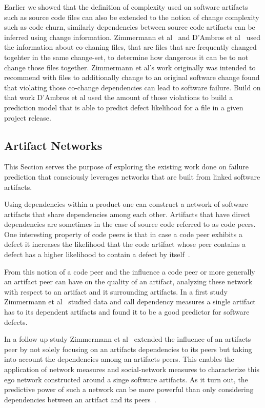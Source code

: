 Earlier we showed that the definition of complexity used on software artifacts such as source code files can also be extended to the notion of change complexity such as code churn, similarly dependencies between source code artifacts can be inferred using change information.
Zimmermann et al~\cite{zimmermann:icse:2004} and D'Ambros et al~\cite{dambros:wcre:2009} used the information about co-chaning files, that are files that are frequently changed togehter in the same change-set, to determine how dangerous it can be to not change those files together.
Zimmermann et al's work originally was intended to recommend with files to additionally change to an original software change  found that violating those co-change dependencies can lead to software failure.
Build on that work D'Ambros et al used the amount of those violations to build a prediction model that is able to predict defect likelihood for a file in a given project release. 


\subsection{Artifact Networks}
\label{chap:6:an}
This Section serves the purpose of exploring the existing work done on failure prediction that consciously leverages networks that are built from linked software artifacts.

Using dependencies within a product one can construct a network of software artifacts that share dependencies among each other.
Artifacts that have direct dependencies are sometimes in the case of source code referred to as code peers.
One interesting property of code peers is that in case a code peer exhibits a defect it increases the likelihood that the code artifact whose peer contains a defect has a higher likelihood to contain a defect by itself~\cite{nguyen:icse:2010}.

From this notion of a code peer and the influence a code peer or more generally an artifact peer can have on the quality of an artifact, analyzing these network with respect to an artifact and it surrounding artifacts.
In a first study Zimmermann et al~\cite{zimmermann:icse:2008} studied data and call dependency measures a single artifact has to its dependent artifacts and found it to be a good predictor for software defects.

In a follow up study Zimmermann et al~\cite{zimmermann:esem:2009} extended the influence of an artifacts peer by not solely focusing on an artifacts dependencies to its peers but taking into account the dependencies among an artifacts peers.
This enables the application of network measures and social-network measures to characterize this ego network constructed around a singe software artifacts.
As it turn out, the predictive power of such a network can be more powerful than only considering dependencies between an artifact and its peers~\cite{zimmermann:esem:2009}.

